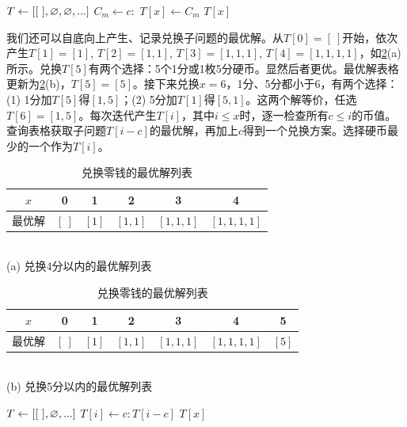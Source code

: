 \documentclass[b5paper]{ctexart}
\begin{document}
\begin{algorithmic}[1]
\State $T \gets [[\ ], \varnothing, \varnothing, ...]$ 
      \State $C_m \gets c :$ 
        \State $T[x] \gets C_m$
      \EndIf
    \EndFor
  \EndIf
  \State \Return $T[x]$
\EndFunction
\end{algorithmic}

我们还可以自底向上产生、记录兑换子问题的最优解。从$T[0] = [\ ]$开始，依次产生$T[1] = [1]$, $T[2] = [1, 1]$, $T[3] = [1, 1, 1]$, $T[4] = [1, 1, 1, 1]$，如\cref{tab:change-money}(a)所示。兑换$T[5]$有两个选择：5个1分或1枚5分硬币。显然后者更优。最优解表格更新为\cref{tab:change-money}(b)，$T[5] = [5]$。接下来兑换$x = 6$，1分、5分都小于6，有两个选择：(1) 1分加$T[5]$得$[1, 5]$；(2) 5分加$T[1]$得$[5, 1]$。这两个解等价，任选$T[6] = [1, 5]$。每次迭代产生$T[i]$，其中$i \leq x$时，逐一检查所有$c \leq i$的币值。查询表格获取子问题$T[i-c]$的最优解，再加上$c$得到一个兑换方案。选择硬币最少的一个作为$T[i]$。

\begin{table}[htbp]
\centering
\begin{tabular}{|c||c|c|c|c|c|}
\hline
$x$ & 0 & 1 & 2 & 3 & 4 \\
\hline
最优解 & $[\ ]$ & $[1]$ & $[1, 1]$ & $[1, 1, 1]$ & $[1, 1, 1, 1]$ \\
\hline
\end{tabular} \\
(a) 兑换4分以内的最优解列表 \\
\vspace{10pt}
\begin{tabular}{|c||c|c|c|c|c|c|}
\hline
$x$ & 0 & 1 & 2 & 3 & 4 & 5 \\
\hline
最优解 & $[\ ]$ & $[1]$ & $[1, 1]$ & $[1, 1, 1]$ & $[1, 1, 1, 1]$ & $[5]$ \\
\hline
\end{tabular} \\
(b) 兑换5分以内的最优解列表 \\
\caption{兑换零钱的最优解列表}
\label{tab:change-money}
\end{table}

\begin{algorithmic}[1]
  \State $T \gets [[\ ], \varnothing, ... ]$
        \State $T[i] \gets  c : T[i-c]$
      \EndIf
    \EndFor
  \EndFor
  \State \Return $T[x]$
\EndFunction
\end{algorithmic}
\end{document}
